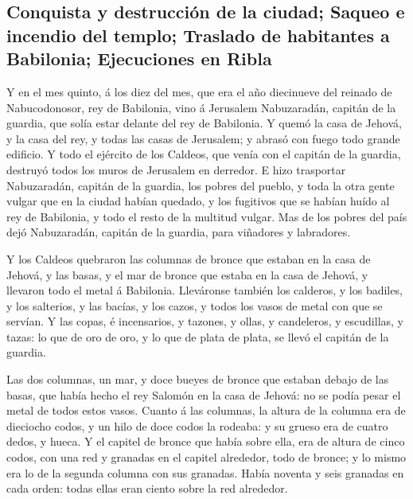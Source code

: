 \hypertarget{conquista-y-destrucciuxf3n-de-la-ciudad-saqueo-e-incendio-del-templo-traslado-de-habitantes-a-babilonia-ejecuciones-en-ribla}{%
\subsection{Conquista y destrucción de la ciudad; Saqueo e incendio del
templo; Traslado de habitantes a Babilonia; Ejecuciones en
Ribla}\label{conquista-y-destrucciuxf3n-de-la-ciudad-saqueo-e-incendio-del-templo-traslado-de-habitantes-a-babilonia-ejecuciones-en-ribla}}

 Y en el mes quinto, á los diez del mes, que era el año
diecinueve del reinado de Nabucodonosor, rey de Babilonia, vino á
Jerusalem Nabuzaradán, capitán de la guardia, que solía estar delante
del rey de Babilonia.  Y quemó la casa de Jehová, y la
casa del rey, y todas las casas de Jerusalem; y abrasó con fuego todo
grande edificio.  Y todo el ejército de los Caldeos, que
venía con el capitán de la guardia, destruyó todos los muros de
Jerusalem en derredor.  E hizo trasportar Nabuzaradán,
capitán de la guardia, los pobres del pueblo, y toda la otra gente
vulgar que en la ciudad habían quedado, y los fugitivos que se habían
huído al rey de Babilonia, y todo el resto de la multitud vulgar.
 Mas de los pobres del país dejó Nabuzaradán, capitán de
la guardia, para viñadores y labradores.

 Y los Caldeos quebraron las columnas de bronce que
estaban en la casa de Jehová, y las basas, y el mar de bronce que estaba
en la casa de Jehová, y llevaron todo el metal á Babilonia.
 Lleváronse también los calderos, y los badiles, y los
salterios, y las bacías, y los cazos, y todos los vasos de metal con que
se servían.  Y las copas, é incensarios, y tazones, y
ollas, y candeleros, y escudillas, y tazas: lo que de oro de oro, y lo
que de plata de plata, se llevó el capitán de la guardia.

 Las dos columnas, un mar, y doce bueyes de bronce que
estaban debajo de las basas, que había hecho el rey Salomón en la casa
de Jehová: no se podía pesar el metal de todos estos vasos.
 Cuanto á las columnas, la altura de la columna era de
dieciocho codos, y un hilo de doce codos la rodeaba: y su grueso era de
cuatro dedos, y hueca.  Y el capitel de bronce que había
sobre ella, era de altura de cinco codos, con una red y granadas en el
capitel alrededor, todo de bronce; y lo mismo era lo de la segunda
columna con sus granadas.  Había noventa y seis granadas
en cada orden: todas ellas eran ciento sobre la red alrededor.

